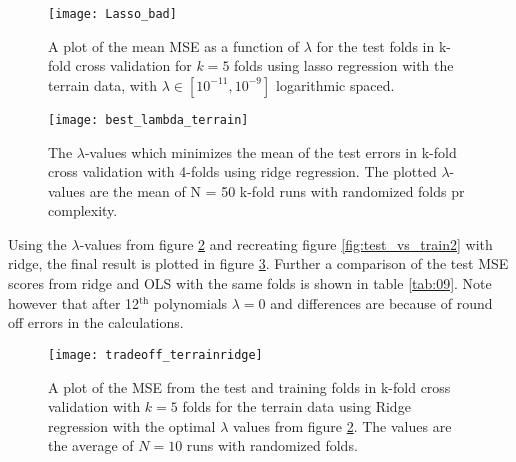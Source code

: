 \documentclass[uio,jmp,amsmath,amssymb,reprint,nofootinbib]{revtex4-1}
\numberwithin{equation}{section}
\begin{document}
\begin{figure}[H]
    \centering
    \texttt{[image: Lasso\_bad]}
    \caption{A plot of the mean MSE as a function of \(\lambda\) for the test folds in k-fold cross validation for \(k=5\) folds using lasso regression with the terrain data, with \(\lambda \in [10^{-11}, 10^{-9}]\) logarithmic spaced.}
    \label{fig:lasso_bad}
\end{figure}

\begin{figure}[H]
    \centering
    \texttt{[image: best\_lambda\_terrain]}
    \caption{The \(\lambda\)-values which minimizes the mean of the test errors in k-fold cross validation with 4-folds using ridge regression. The plotted \(\lambda\)-values are the mean of N = 50 k-fold runs with randomized folds pr complexity.}
    \label{fig:lambda_pr_degree_terrain}
\end{figure}

Using the \(\lambda\)-values from figure \ref{fig:lambda_pr_degree_terrain} and recreating figure \ref{fig:test_vs_train2} with ridge, the final result is plotted in figure \ref{fig:test_vs_train2ridge}. Further a comparison of the test MSE scores from ridge and OLS with the same folds is shown in table \ref{tab:09}. Note however that after 12\(^\text{th}\) polynomials \(\lambda = 0\) and differences are because of round off errors in the calculations.

\begin{figure}[H]
    \centering
    \texttt{[image: tradeoff\_terrainridge]}
    \caption{A plot of the MSE from the test and training folds in k-fold cross validation with \(k=5\) folds for the terrain data using Ridge regression with the optimal \(\lambda\) values from figure \ref{fig:lambda_pr_degree_terrain}. The values are the average of \(N=10\) runs with randomized folds.}
    \label{fig:test_vs_train2ridge}
\end{figure}
\end{document}

